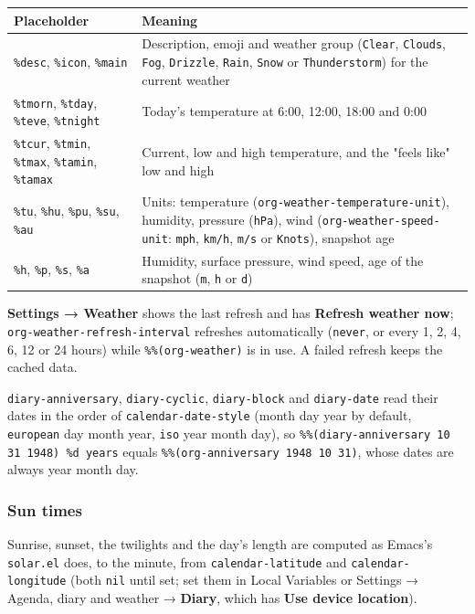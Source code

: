 \documentclass[11pt]{article}
\begin{document}
\begin{center}
\begin{tabular}{ll}
Placeholder & Meaning\\[0pt]
\hline
\texttt{\%desc}, \texttt{\%icon}, \texttt{\%main} & Description, emoji and weather group (\texttt{Clear}, \texttt{Clouds}, \texttt{Fog}, \texttt{Drizzle}, \texttt{Rain}, \texttt{Snow} or \texttt{Thunderstorm}) for the current weather\\[0pt]
\texttt{\%tmorn}, \texttt{\%tday}, \texttt{\%teve}, \texttt{\%tnight} & Today's temperature at 6:00, 12:00, 18:00 and 0:00\\[0pt]
\texttt{\%tcur}, \texttt{\%tmin}, \texttt{\%tmax}, \texttt{\%tamin}, \texttt{\%tamax} & Current, low and high temperature, and the "feels like" low and high\\[0pt]
\texttt{\%tu}, \texttt{\%hu}, \texttt{\%pu}, \texttt{\%su}, \texttt{\%au} & Units: temperature (\texttt{org-weather-temperature-unit}), humidity, pressure (\texttt{hPa}), wind (\texttt{org-weather-speed-unit}: \texttt{mph}, \texttt{km/h}, \texttt{m/s} or \texttt{Knots}), snapshot age\\[0pt]
\texttt{\%h}, \texttt{\%p}, \texttt{\%s}, \texttt{\%a} & Humidity, surface pressure, wind speed, age of the snapshot (\texttt{m}, \texttt{h} or \texttt{d})\\[0pt]
\end{tabular}
\end{center}

\textbf{Settings → Weather} shows the last refresh and has \textbf{Refresh weather now}; \texttt{org-weather-refresh-interval} refreshes automatically (\texttt{never}, or every 1, 2, 4, 6, 12 or 24 hours) while \texttt{\%\%(org-weather)} is in use. A failed refresh keeps the cached data.

\texttt{diary-anniversary}, \texttt{diary-cyclic}, \texttt{diary-block} and \texttt{diary-date} read their dates in the order of \texttt{calendar-date-style} (month day year by default, \texttt{european} day month year, \texttt{iso} year month day), so \texttt{\%\%(diary-anniversary 10 31 1948) \%d years} equals \texttt{\%\%(org-anniversary 1948 10 31)}, whose dates are always year month day.

\subsubsection{Sun times}
\label{sec:org88a17f5}
Sunrise, sunset, the twilights and the day's length are computed as Emacs's \texttt{solar.el} does, to the minute, from \texttt{calendar-latitude} and \texttt{calendar-longitude} (both \texttt{nil} until set; set them in Local Variables or Settings → Agenda, diary and weather → \textbf{Diary}, which has \textbf{Use device location}).
\end{document}
